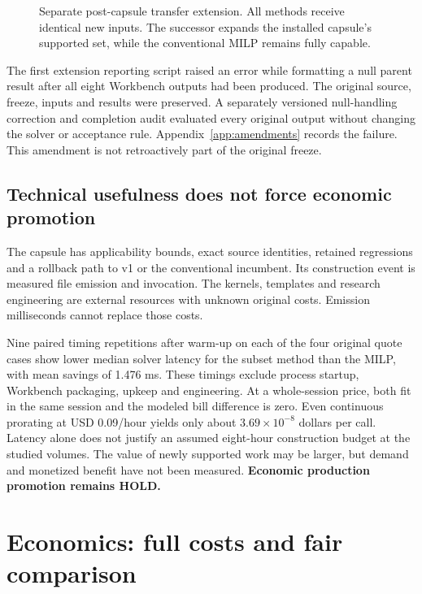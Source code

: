 \begin{figure}[htbp]\centering
\caption{Separate post-capsule transfer extension. All methods receive identical new inputs. The successor expands the installed capsule's supported set, while the conventional MILP remains fully capable.}\label{fig:transfer}
\end{figure}

The first extension reporting script raised an error while formatting a null parent result after all eight Workbench outputs had been produced. The original source, freeze, inputs and results were preserved. A separately versioned null-handling correction and completion audit evaluated every original output without changing the solver or acceptance rule. Appendix~\ref{app:amendments} records the failure. This amendment is not retroactively part of the original freeze.

\subsection{Technical usefulness does not force economic promotion}

The capsule has applicability bounds, exact source identities, retained regressions and a rollback path to v1 or the conventional incumbent. Its construction event is measured file emission and invocation. The kernels, templates and research engineering are external resources with unknown original costs. Emission milliseconds cannot replace those costs.

Nine paired timing repetitions after warm-up on each of the four original quote cases show lower median solver latency for the subset method than the MILP, with mean savings of 1.476 ms. These timings exclude process startup, Workbench packaging, upkeep and engineering. At a whole-session price, both fit in the same session and the modeled bill difference is zero. Even continuous prorating at USD 0.09/hour yields only about $3.69\times10^{-8}$ dollars per call. Latency alone does not justify an assumed eight-hour construction budget at the studied volumes. The value of newly supported work may be larger, but demand and monetized benefit have not been measured. \textbf{Economic production promotion remains HOLD.}

\section{Economics: full costs and fair comparison}\label{sec:economics}






